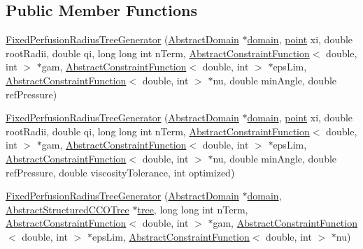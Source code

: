 \subsection*{Public Member Functions}
\begin{DoxyCompactItemize}
\item 
\hyperlink{class_fixed_perfusion_radius_tree_generator_a970125bd4e62f257d646c0ef3e0e7db6}{Fixed\+Perfusion\+Radius\+Tree\+Generator} (\hyperlink{class_abstract_domain}{Abstract\+Domain} $\ast$\hyperlink{class_fixed_perfusion_radius_tree_generator_a3f613d457aa40ecbec9c61b0fd559764}{domain}, \hyperlink{structpoint}{point} xi, double root\+Radii, double qi, long long int n\+Term, \hyperlink{class_abstract_constraint_function}{Abstract\+Constraint\+Function}$<$ double, int $>$ $\ast$gam, \hyperlink{class_abstract_constraint_function}{Abstract\+Constraint\+Function}$<$ double, int $>$ $\ast$eps\+Lim, \hyperlink{class_abstract_constraint_function}{Abstract\+Constraint\+Function}$<$ double, int $>$ $\ast$nu, double min\+Angle, double ref\+Pressure)
\item 
\hyperlink{class_fixed_perfusion_radius_tree_generator_a00a16101933078dfdcf037ef149348d9}{Fixed\+Perfusion\+Radius\+Tree\+Generator} (\hyperlink{class_abstract_domain}{Abstract\+Domain} $\ast$\hyperlink{class_fixed_perfusion_radius_tree_generator_a3f613d457aa40ecbec9c61b0fd559764}{domain}, \hyperlink{structpoint}{point} xi, double root\+Radii, double qi, long long int n\+Term, \hyperlink{class_abstract_constraint_function}{Abstract\+Constraint\+Function}$<$ double, int $>$ $\ast$gam, \hyperlink{class_abstract_constraint_function}{Abstract\+Constraint\+Function}$<$ double, int $>$ $\ast$eps\+Lim, \hyperlink{class_abstract_constraint_function}{Abstract\+Constraint\+Function}$<$ double, int $>$ $\ast$nu, double min\+Angle, double ref\+Pressure, double viscosity\+Tolerance, int optimized)
\item 
\hyperlink{class_fixed_perfusion_radius_tree_generator_a415ddd819e62f818b91bc40612ba1a7f}{Fixed\+Perfusion\+Radius\+Tree\+Generator} (\hyperlink{class_abstract_domain}{Abstract\+Domain} $\ast$\hyperlink{class_fixed_perfusion_radius_tree_generator_a3f613d457aa40ecbec9c61b0fd559764}{domain}, \hyperlink{class_abstract_structured_c_c_o_tree}{Abstract\+Structured\+C\+C\+O\+Tree} $\ast$\hyperlink{class_fixed_perfusion_radius_tree_generator_a79a3059e0c4555a2008829d5a51803dd}{tree}, long long int n\+Term, \hyperlink{class_abstract_constraint_function}{Abstract\+Constraint\+Function}$<$ double, int $>$ $\ast$gam, \hyperlink{class_abstract_constraint_function}{Abstract\+Constraint\+Function}$<$ double, int $>$ $\ast$eps\+Lim, \hyperlink{class_abstract_constraint_function}{Abstract\+Constraint\+Function}$<$ double, int $>$ $\ast$nu)

\end{DoxyCompactItemize}
